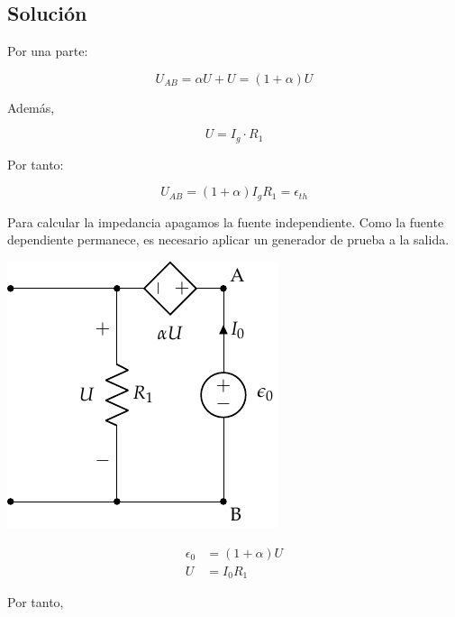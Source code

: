 \documentclass[12pt]{article}
\begin{document}
\noindent\hrulefill

\subsection*{Solución}

Por una parte:

\begin{equation*}
  U_{AB} = \alpha U + U = (1 + \alpha) U
\end{equation*}

Además,

\begin{equation*}
  U = I_g \cdot R_1
\end{equation*}

Por tanto:

\begin{equation*}
  U_{AB} = (1 + \alpha) I_g R_1 = \epsilon_{th}
\end{equation*}

Para calcular la impedancia apagamos la fuente independiente. Como la fuente dependiente permanece, es necesario aplicar un generador de prueba a la salida.

\begin{minipage}{0.5\linewidth}
  \begin{center}
    \includegraphics{../figs/Thevenin1_fuenteprueba}
  \end{center}
\end{minipage}
\begin{minipage}{0.5\linewidth}
  \begin{align*}
    \epsilon_0 &= (1 + \alpha) U\\
    U &= I_0 R_1
  \end{align*}
\end{minipage}
Por tanto,
\end{document}
